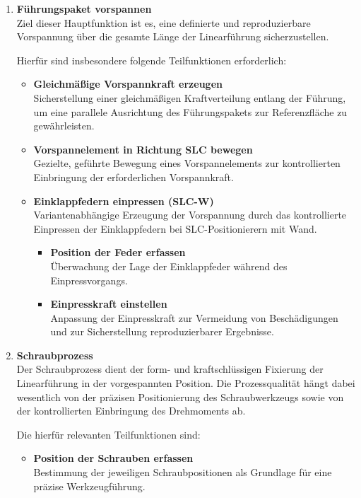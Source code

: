 \begin{enumerate}
    \item \textbf{Führungspaket vorspannen}\\
    Ziel dieser Hauptfunktion ist es, eine definierte und reproduzierbare Vorspannung über die gesamte Länge der Linearführung sicherzustellen.

    Hierfür sind insbesondere folgende Teilfunktionen erforderlich:
    \begin{itemize}
        \item \textbf{Gleichmäßige Vorspannkraft erzeugen}\\
        Sicherstellung einer gleichmäßigen Kraftverteilung entlang der Führung, um eine parallele Ausrichtung des Führungspakets zur Referenzfläche zu gewährleisten.

        \item \textbf{Vorspannelement in Richtung SLC bewegen}\\
        Gezielte, geführte Bewegung eines Vorspannelements zur kontrollierten Einbringung der erforderlichen Vorspannkraft.

        \item \textbf{Einklappfedern einpressen (SLC-W)}\\
        Variantenabhängige Erzeugung der Vorspannung durch das kontrollierte Einpressen der Einklappfedern bei SLC-Positionierern mit Wand.
        \begin{itemize}
            \item \textbf{Position der Feder erfassen}\\
            Überwachung der Lage der Einklappfeder während des Einpressvorgangs.
            \item \textbf{Einpresskraft einstellen}\\
            Anpassung der Einpresskraft zur Vermeidung von Beschädigungen und zur Sicherstellung reproduzierbarer Ergebnisse.
        \end{itemize}
    \end{itemize}
    
    \item \textbf{Schraubprozess}\\
    Der Schraubprozess dient der form- und kraftschlüssigen Fixierung der Linearführung in der vorgespannten Position. Die Prozessqualität hängt dabei wesentlich von der präzisen Positionierung des Schraubwerkzeugs sowie von der kontrollierten Einbringung des Drehmoments ab.

    Die hierfür relevanten Teilfunktionen sind:
    \begin{itemize}
        \item \textbf{Position der Schrauben erfassen}\\
        Bestimmung der jeweiligen Schraubpositionen als Grundlage für eine präzise Werkzeugführung.


\end{itemize}
\end{enumerate}
